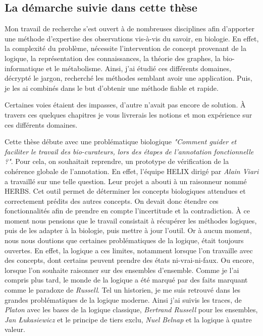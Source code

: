 \begin{refsection}
\section*{La démarche suivie dans cette thèse}

Mon travail de recherche s'est ouvert à de nombreuses disciplines afin d'apporter une méthode d'expertise des observations vis-à-vis du savoir, en biologie. En effet, la complexité du problème, nécessite l'intervention de concept provenant de la logique, la représentation des connaissances, la théorie des graphes, la bio-informatique et le métabolisme. Ainsi, j'ai étudié ces différents domaines, décrypté le jargon, recherché les méthodes semblant avoir une application. Puis, je les ai combinés dans le but d'obtenir une méthode fiable et rapide.

Certaines voies étaient des impasses, d'autre n'avait pas encore de solution. À travers ces quelques chapitres je vous livrerais les notions et mon expérience sur ces différents domaines.

Cette thèse débute avec une problématique biologique \textit{"Comment guider et faciliter le travail des bio-curateurs, lors des étapes de l'annotation fonctionnelle ?"}. Pour cela, on souhaitait reprendre, un prototype de vérification de la cohérence globale de l'annotation. En effet, l'équipe HELIX dirigé par \textit{Alain Viari} a travaillé sur une telle question. Leur projet a abouti à un raisonneur nommé HERBS. Cet outil permet de déterminer les concepts biologiques attendues et correctement prédits des autres concepts. On devait donc étendre ces fonctionnalités afin de prendre en compte l'incertitude et la contradiction. À ce moment nous pensions que le travail consistait à récupérer les méthodes logiques, puis de les adapter à la biologie, puis mettre à jour l'outil. Or à aucun moment, nous nous doutions que certaines problématiques de la logique, était toujours ouvertes. En effet, la logique a ces limites, notamment lorsque l'on travaille avec des concepts, dont certains peuvent prendre des états ni-vrai-ni-faux. Ou encore, lorsque l'on souhaite raisonner sur des ensembles d'ensemble. Comme je l'ai compris plus tard, le monde de la logique a été marqué par des faits marquant comme le paradoxe de \textit{Russell}. Tel un historien, je me suis retrouvé dans les grandes problématiques de la logique moderne. Ainsi j'ai suivis les traces, de \textit{Platon} avec les bases de la logique classique, \textit{Bertrand Russell} pour les ensembles, \textit{Jan Łukasiewicz} et le principe de tiers exclu, \textit{Nuel Belnap} et la logique à quatre valeur.


\end{refsection}
